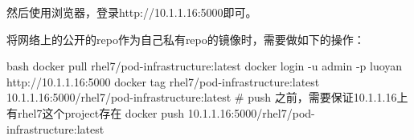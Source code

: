 然后使用浏览器，登录http://10.1.1.16:5000即可。

将网络上的公开的repo作为自己私有repo的镜像时，需要做如下的操作：
\begin{code-block}{bash}
docker pull rhel7/pod-infrastructure:latest
docker login -u admin -p luoyan http://10.1.1.16:5000
docker tag rhel7/pod-infrastructure:latest 10.1.1.16:5000/rhel7/pod-infrastructure:latest
# push 之前，需要保证10.1.1.16上有rhel7这个project存在
docker push 10.1.1.16:5000/rhel7/pod-infrastructure:latest
\end{code-block}
